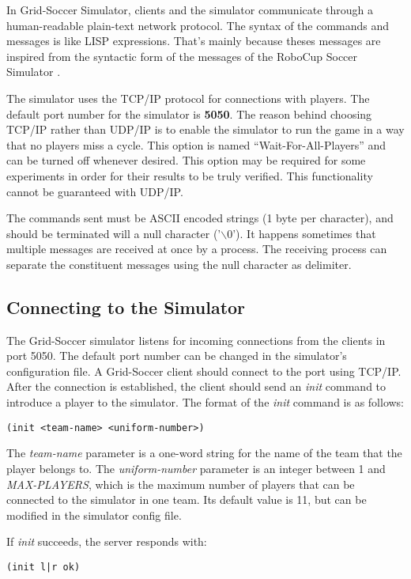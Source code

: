 \documentclass[12pt,titlepage,a4paper]{article}
\begin{document}
In Grid-Soccer Simulator, clients and the simulator communicate through a human-readable plain-text network protocol. The syntax of the commands and messages is like LISP expressions. That's mainly because theses messages are inspired from the syntactic form of the messages of the RoboCup Soccer Simulator \cite{sservermanual03}.

The simulator uses the TCP/IP protocol for connections with players. The default port number for the simulator is \textbf{5050}. The reason behind choosing TCP/IP rather than UDP/IP is to enable the simulator to run the game in a way that no players miss a cycle. This option is named ``Wait-For-All-Players'' and can be turned off whenever desired. This option may be required for some experiments in order for their results to be truly verified. This functionality cannot be guaranteed with UDP/IP.

The commands sent must be ASCII encoded strings (1 byte per character), and should be terminated will a null character ('$\backslash 0$'). It happens sometimes that multiple messages are received at once by a process. The receiving process can separate the constituent messages using the null character as delimiter. 

\subsection{Connecting to the Simulator}

The Grid-Soccer simulator listens for incoming connections from the clients in port 5050. The default port number can be changed in the simulator's configuration file. A Grid-Soccer client should connect to the port using TCP/IP. After the connection is established, the client should send an \emph{init} command to introduce a player to the simulator. The format of the \emph{init} command is as follows:
\begin{verbatim}
(init <team-name> <uniform-number>)
\end{verbatim}

The \emph{team-name} parameter is a one-word string for the name of the team that the player belongs to. The \emph{uniform-number} parameter is an integer between 1 and \emph{MAX-PLAYERS}, which is the maximum number of players that can be connected to the simulator in one team. Its default value is 11, but can be modified in the simulator config file.

If \emph{init} succeeds, the server responds with:
\begin{verbatim}
(init l|r ok)
\end{verbatim}
\end{document}
